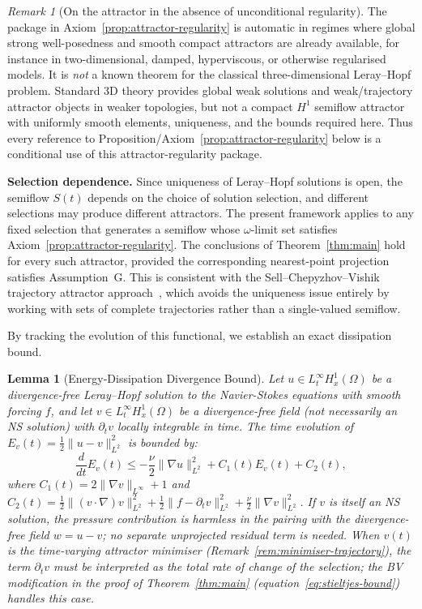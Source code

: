 \documentclass[12pt,a4paper]{article}
\theoremstyle{definition}
\theoremstyle{plain}
\newtheorem{lemma}[definition]{Lemma}
\theoremstyle{remark}
\newtheorem{remark}[definition]{Remark}
\begin{document}
\begin{remark}[On the attractor in the absence of unconditional regularity]
\label{rem:circularity}
The package in Axiom~\ref{prop:attractor-regularity} is automatic in
regimes where global strong well-posedness and smooth compact attractors
are already available, for instance in two-dimensional, damped,
hyperviscous, or otherwise regularised models.  It is \emph{not} a known
theorem for the classical three-dimensional Leray--Hopf problem.  Standard
3D theory provides global weak solutions and weak/trajectory attractor
objects in weaker topologies, but not a compact $H^1$ semiflow attractor
with uniformly smooth elements, uniqueness, and the bounds required here.
Thus every reference to Proposition/Axiom~\ref{prop:attractor-regularity}
below is a conditional use of this attractor-regularity package.

\medskip\noindent
\textbf{Selection dependence.}\;
Since uniqueness of Leray--Hopf solutions is open, the semiflow
$S(t)$ depends on the choice of solution selection, and different
selections may produce different attractors.  The present framework
applies to any fixed selection that generates a semiflow whose
$\omega$-limit set satisfies Axiom~\ref{prop:attractor-regularity}.
The conclusions of Theorem~\ref{thm:main} hold for every such
attractor, provided the corresponding nearest-point projection
satisfies Assumption~G.
This is consistent with the Sell--Chepyzhov--Vishik trajectory
attractor approach~\cite{ChepyzhovVishik2002}, which avoids the
uniqueness issue entirely by working with sets of complete
trajectories rather than a single-valued semiflow.
\end{remark}

By tracking the evolution of this functional, we establish an exact dissipation bound.

\begin{lemma}[Energy-Dissipation Divergence Bound]
\label{lem:entropy-bound}
Let $u \in L^\infty_t H^1_x(\Omega)$ be a divergence-free Leray--Hopf solution to the Navier-Stokes equations with smooth forcing $f$, and let $v \in L^\infty_t H^1_x(\Omega)$ be a divergence-free field (not necessarily an NS solution) with $\partial_t v$ locally integrable in time. The time evolution of $E_{v}(t) = \frac{1}{2}\| u - v \|_{L^2}^2$ is bounded by:
\begin{equation}
    \frac{d}{dt} E_{v}(t) \le - \frac{\nu}{2} \|\nabla u\|_{L^2}^2 + C_1(t) E_{v}(t) + C_2(t),
\end{equation}
where $C_1(t) = 2\|\nabla v\|_{L^\infty} + 1$ and $C_2(t) = \frac{1}{2}\|(v \cdot \nabla)v\|_{L^2}^2 + \frac{1}{2}\|f - \partial_t v\|_{L^2}^2 + \frac{\nu}{2}\|\nabla v\|_{L^2}^2$. If $v$ is itself an NS solution, the pressure contribution is harmless in the pairing with the divergence-free field $w=u-v$; no separate unprojected residual term is needed.
When $v(t)$ is the time-varying attractor minimiser (Remark~\ref{rem:minimiser-trajectory}), the term $\partial_t v$ must be interpreted as the total rate of change of the selection; the BV modification in the proof of Theorem~\ref{thm:main} (equation~\eqref{eq:stieltjes-bound}) handles this case.
\end{lemma}
\end{document}

